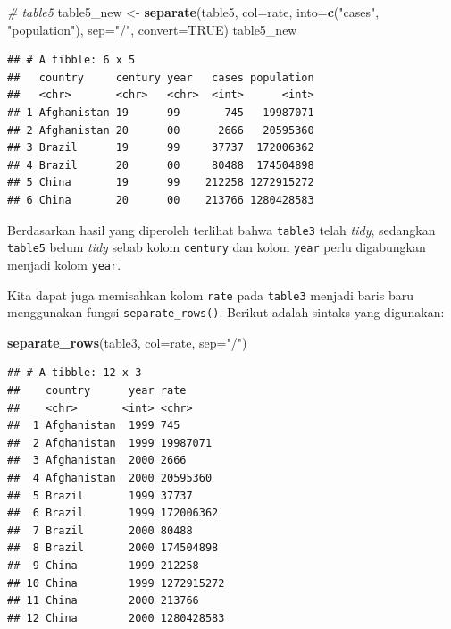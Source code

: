 \documentclass[]{book}
\newenvironment{Shaded}{\begin{snugshade}}{\end{snugshade}}
\newcommand{\KeywordTok}[1]{\textcolor[rgb]{0.13,0.29,0.53}{\textbf{#1}}}
\newcommand{\DataTypeTok}[1]{\textcolor[rgb]{0.13,0.29,0.53}{#1}}
\newcommand{\StringTok}[1]{\textcolor[rgb]{0.31,0.60,0.02}{#1}}
\newcommand{\CommentTok}[1]{\textcolor[rgb]{0.56,0.35,0.01}{\textit{#1}}}
\newcommand{\OtherTok}[1]{\textcolor[rgb]{0.56,0.35,0.01}{#1}}
\newcommand{\NormalTok}[1]{#1}
\begin{document}
\begin{Shaded}
\begin{Highlighting}[]
\CommentTok{# table5}
\NormalTok{table5_new <-}\StringTok{ }\KeywordTok{separate}\NormalTok{(table5, }\DataTypeTok{col=}\NormalTok{rate,}
                       \DataTypeTok{into=}\KeywordTok{c}\NormalTok{(}\StringTok{"cases"}\NormalTok{, }\StringTok{"population"}\NormalTok{),}
                       \DataTypeTok{sep=}\StringTok{"/"}\NormalTok{, }\DataTypeTok{convert=}\OtherTok{TRUE}\NormalTok{)}
\NormalTok{table5_new}
\end{Highlighting}
\end{Shaded}

\begin{verbatim}
## # A tibble: 6 x 5
##   country     century year   cases population
##   <chr>       <chr>   <chr>  <int>      <int>
## 1 Afghanistan 19      99       745   19987071
## 2 Afghanistan 20      00      2666   20595360
## 3 Brazil      19      99     37737  172006362
## 4 Brazil      20      00     80488  174504898
## 5 China       19      99    212258 1272915272
## 6 China       20      00    213766 1280428583
\end{verbatim}

Berdasarkan hasil yang diperoleh terlihat bahwa \texttt{table3} telah
\emph{tidy}, sedangkan \texttt{table5} belum \emph{tidy} sebab kolom
\texttt{century} dan kolom \texttt{year} perlu digabungkan menjadi kolom
\texttt{year}.

Kita dapat juga memisahkan kolom \texttt{rate} pada \texttt{table3}
menjadi baris baru menggunakan fungsi \texttt{separate\_rows()}. Berikut
adalah sintaks yang digunakan:

\begin{Shaded}
\begin{Highlighting}[]
\KeywordTok{separate_rows}\NormalTok{(table3, }\DataTypeTok{col=}\NormalTok{rate, }\DataTypeTok{sep=}\StringTok{"/"}\NormalTok{)}
\end{Highlighting}
\end{Shaded}

\begin{verbatim}
## # A tibble: 12 x 3
##    country      year rate      
##    <chr>       <int> <chr>     
##  1 Afghanistan  1999 745       
##  2 Afghanistan  1999 19987071  
##  3 Afghanistan  2000 2666      
##  4 Afghanistan  2000 20595360  
##  5 Brazil       1999 37737     
##  6 Brazil       1999 172006362 
##  7 Brazil       2000 80488     
##  8 Brazil       2000 174504898 
##  9 China        1999 212258    
## 10 China        1999 1272915272
## 11 China        2000 213766    
## 12 China        2000 1280428583
\end{verbatim}
\end{document}
